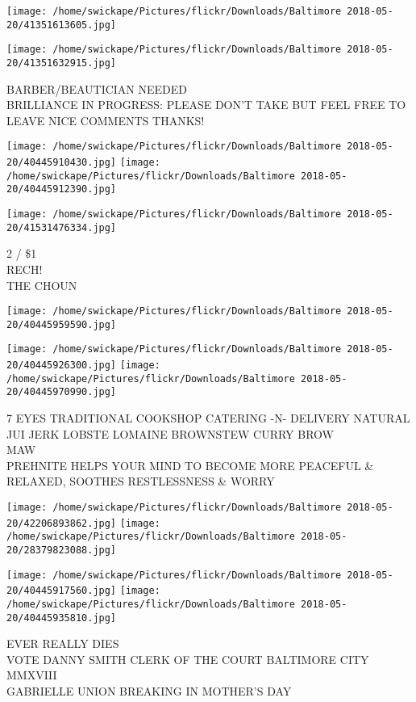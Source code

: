 \documentclass[10pt,letterpaper]{article}
\begin{document}
\texttt{[image: /home/swickape/Pictures/flickr/Downloads/Baltimore 2018-05-20/41351613605.jpg]}

\vspace{0.25in}
\texttt{[image: /home/swickape/Pictures/flickr/Downloads/Baltimore 2018-05-20/41351632915.jpg]}

BARBER/BEAUTICIAN NEEDED\\
BRILLIANCE IN PROGRESS: PLEASE DON'T TAKE BUT FEEL FREE TO LEAVE NICE COMMENTS THANKS!
\pagebreak

\texttt{[image: /home/swickape/Pictures/flickr/Downloads/Baltimore 2018-05-20/40445910430.jpg]}
\texttt{[image: /home/swickape/Pictures/flickr/Downloads/Baltimore 2018-05-20/40445912390.jpg]}

\vspace{0.25in}
\texttt{[image: /home/swickape/Pictures/flickr/Downloads/Baltimore 2018-05-20/41531476334.jpg]}

2 / \$1\\
RECH!\\
THE CHOUN
\pagebreak

\texttt{[image: /home/swickape/Pictures/flickr/Downloads/Baltimore 2018-05-20/40445959590.jpg]}

\vspace{0.25in}
\texttt{[image: /home/swickape/Pictures/flickr/Downloads/Baltimore 2018-05-20/40445926300.jpg]}
\texttt{[image: /home/swickape/Pictures/flickr/Downloads/Baltimore 2018-05-20/40445970990.jpg]}

7 EYES TRADITIONAL COOKSHOP CATERING {-}N{-} DELIVERY NATURAL JUI JERK LOBSTE LOMAINE BROWNSTEW CURRY BROW\\
MAW\\
PREHNITE HELPS YOUR MIND TO BECOME MORE PEACEFUL \& RELAXED, SOOTHES RESTLESSNESS \& WORRY
\pagebreak

\texttt{[image: /home/swickape/Pictures/flickr/Downloads/Baltimore 2018-05-20/42206893862.jpg]}
\texttt{[image: /home/swickape/Pictures/flickr/Downloads/Baltimore 2018-05-20/28379823088.jpg]}

\texttt{[image: /home/swickape/Pictures/flickr/Downloads/Baltimore 2018-05-20/40445917560.jpg]}
\texttt{[image: /home/swickape/Pictures/flickr/Downloads/Baltimore 2018-05-20/40445935810.jpg]}

EVER REALLY DIES\\
VOTE DANNY SMITH CLERK OF THE COURT BALTIMORE CITY\\
MMXVIII\\
GABRIELLE UNION BREAKING IN MOTHER'S DAY
\pagebreak
\end{document}
